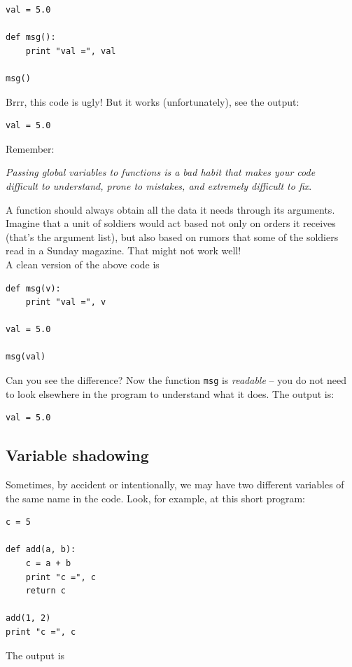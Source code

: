 \begin{verbatim}
val = 5.0

def msg():
    print "val =", val

msg()
\end{verbatim}
Brrr, this code is ugly! But it works (unfortunately), see the output:

\begin{verbatim}
val = 5.0
\end{verbatim}
Remember:\\

\begin{center}
{\em Passing global variables to functions is a bad habit that makes your code\\
     difficult to understand, prone to mistakes, and extremely difficult to fix}.\\
\end{center}
\vspace{4mm}
\noindent
A function should always
obtain all the data it needs through its arguments. Imagine that a unit of soldiers 
would act based not only on orders it receives (that's the argument 
list), but also based on rumors that some of the soldiers read in a Sunday magazine. 
That might not work well!\\

\noindent
A clean version of the above code is

\begin{verbatim}
def msg(v):
    print "val =", v

val = 5.0

msg(val)
\end{verbatim}
Can you see the difference? Now the function {\tt msg} is {\em readable} -- you do not 
need to look elsewhere in the program to understand what it does. The output is:

\begin{verbatim}
val = 5.0
\end{verbatim}

\subsection{Variable shadowing}

Sometimes, by accident or intentionally, we may have two different 
variables of the same name in the code. Look, for example, at this short program:

\begin{verbatim}
c = 5

def add(a, b):
    c = a + b
    print "c =", c
    return c

add(1, 2)
print "c =", c
\end{verbatim}
The output is

